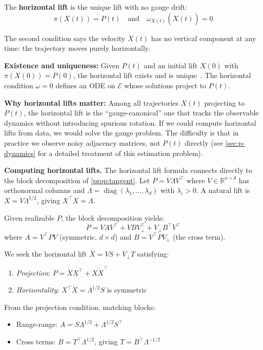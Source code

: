 \documentclass{article}
\newcommand{\RR}{\mathbb{R}}
\DeclareMathOperator{\diag}{diag}
\theoremstyle{plain}
\theoremstyle{definition}
\theoremstyle{remark}
\begin{document}
The \textbf{horizontal lift} is the unique lift with no gauge drift:
\begin{equation}
\pi(X(t)) = P(t) \quad \text{and} \quad \omega_{X(t)}(\dot{X}(t)) = 0
\end{equation}

The second condition says the velocity $\dot{X}(t)$ has no vertical component at any time: the trajectory moves purely horizontally.

\textbf{Existence and uniqueness:}
Given $P(t)$ and an initial lift $X(0)$ with $\pi(X(0)) = P(0)$, the horizontal lift exists and is unique~\citep{kobayashi1963foundations}.
The horizontal condition $\omega = 0$ defines an ODE on $\mathcal{E}$ whose solutions project to $P(t)$.

\textbf{Why horizontal lifts matter:}
Among all trajectories $X(t)$ projecting to $P(t)$, the horizontal lift is the ``gauge-canonical'' one that tracks the observable dynamics without introducing spurious rotation.
If we could compute horizontal lifts from data, we would solve the gauge problem.
The difficulty is that in practice we observe noisy adjacency matrices, not $P(t)$ directly (see \cref{sec:p-dynamics} for a detailed treatment of this estimation problem).

\textbf{Computing horizontal lifts.}
The horizontal lift formula connects directly to the block decomposition of \cref{prop:tangent}.
Let $P = V \Lambda V^\top$ where $V \in \RR^{n \times d}$ has orthonormal columns and $\Lambda = \diag(\lambda_1, \ldots, \lambda_d)$ with $\lambda_\iota > 0$.
A natural lift is $X = V \Lambda^{1/2}$, giving $X^\top X = \Lambda$.

Given realizable $\dot{P}$, the block decomposition yields:
\begin{equation}
\dot{P} = V A V^\top + V B V_\perp^\top + V_\perp B^\top V^\top
\end{equation}
where $A = V^\top \dot{P} V$ (symmetric, $d \times d$) and $B = V^\top \dot{P} V_\perp$ (the cross term).

We seek the horizontal lift $\dot{X} = V S + V_\perp T$ satisfying:
\begin{enumerate}
\item \emph{Projection}: $\dot{P} = \dot{X} X^\top + X \dot{X}^\top$
\item \emph{Horizontality}: $X^\top \dot{X} = \Lambda^{1/2} S$ is symmetric
\end{enumerate}

From the projection condition, matching blocks:
\begin{itemize}
\item Range-range: $A = S \Lambda^{1/2} + \Lambda^{1/2} S^\top$
\item Cross terms: $B = T^\top \Lambda^{1/2}$, giving $T = B^\top \Lambda^{-1/2}$
\end{itemize}
\end{document}
